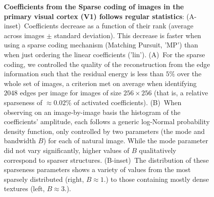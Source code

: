 \documentclass[a4paper, 10pt, twocolumns]{article}
\begin{document}
\begin{figure}[t!]%
\caption{
{\bf Coefficients from the Sparse coding of images in the primary visual cortex (V1) follows regular statistics}: \textsf{(A-inset)}~Coefficients decrease as a function of their rank (average across images $\pm$ standard deviation). This decrease is faster when using a sparse coding mechanism (Matching Pursuit, 'MP') than when just ordering the linear coefficients ('lin'). \textsf{(A)}~For the sparse coding, we controlled the quality of the reconstruction from the edge information such that the residual energy is less than $5\%$ over the whole set of images, a criterion met on average when identifying $2048$ edges per image for images of size $256\times 256$ (that is, a relative sparseness of $\approx 0.02\%$ of activated coefficients).
\textsf{(B)}~When observing on an image-by-image basis the histogram of the coefficients' amplitude, each follows a generic log-Normal probability density function, only controlled by two parameters (the mode and bandwidth $B$) for each of natural image. While the mode parameter did not vary significantly, higher values of $B$ qualitatively correspond to sparser structures.%
\textsf{(B-inset)}~The distribution of these sparseness parameters shows a variety of values from the most sparsely distributed (right, $B\approx1.$) to those containing mostly dense textures (left, $B\approx3.$).
\label{fig:EUVIP_sparseness}}%
\end{figure}%
\end{document}
